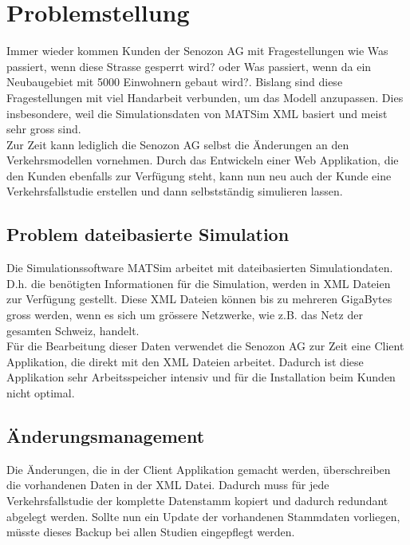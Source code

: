 \chapter{Problemstellung}
Immer wieder kommen Kunden der Senozon AG mit Fragestellungen wie \glqq{} Was passiert, wenn diese Strasse gesperrt wird?\grqq{} oder \glqq{} Was passiert, wenn da ein Neubaugebiet mit 5000 Einwohnern gebaut wird?\grqq{}. Bislang sind diese Fragestellungen mit viel Handarbeit verbunden, um das Modell anzupassen. Dies insbesondere, weil die Simulationsdaten von MATSim XML basiert und meist sehr gross sind.\\
Zur Zeit kann lediglich die Senozon AG selbst die Änderungen an den Verkehrsmodellen vornehmen. Durch das Entwickeln einer Web Applikation, die den Kunden ebenfalls zur Verfügung steht, kann nun neu auch der Kunde eine Verkehrsfallstudie erstellen und dann selbstständig simulieren lassen.
\section{Problem dateibasierte Simulation}
Die Simulationssoftware MATSim arbeitet mit dateibasierten Simulationdaten. D.h. die benötigten Informationen für die Simulation, werden in XML Dateien zur Verfügung gestellt. Diese XML Dateien können bis zu mehreren GigaBytes gross werden, wenn es sich um grössere Netzwerke, wie z.B. das Netz der gesamten Schweiz, handelt.\\
Für die Bearbeitung dieser Daten verwendet die Senozon AG zur Zeit eine Client Applikation, die direkt mit den XML Dateien arbeitet. Dadurch ist diese Applikation sehr Arbeitsspeicher intensiv und für die Installation beim Kunden nicht optimal.
\section{Änderungsmanagement}
Die Änderungen, die in der Client Applikation gemacht werden, überschreiben die vorhandenen Daten in der XML Datei. Dadurch muss für jede Verkehrsfallstudie der komplette Datenstamm kopiert und dadurch redundant abgelegt werden. Sollte nun ein Update der vorhandenen Stammdaten vorliegen, müsste dieses Backup bei allen Studien eingepflegt werden.\\